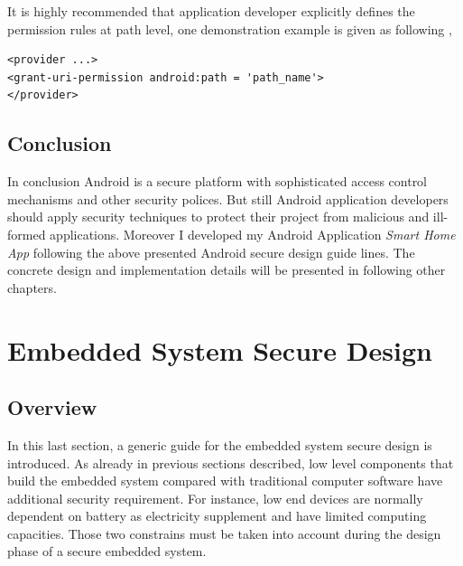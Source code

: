 It is highly recommended that application developer explicitly defines the permission rules at path level, one demonstration example is given as following \cite{android_secure_cook}, 
\begin{Verbatim}[fontsize=\relsize{-1},frame=lines,framesep=4mm, label=\fbox{\small\emph{Content Path Securing}}]
<provider ...>
<grant-uri-permission android:path = 'path_name'>
</provider>
\end{Verbatim} 
\subsection{Conclusion}
In conclusion Android is  a secure platform with sophisticated access control mechanisms and other security polices. But still Android application developers should apply security techniques to protect their project from malicious and ill-formed applications. Moreover I developed my Android Application \emph{Smart Home App} following the above presented Android secure design guide lines. The concrete design and implementation details will be presented in following other chapters. 

\section{Embedded System Secure Design}
\subsection{Overview}
In this last section, a generic guide for the embedded system secure design is introduced. As already in previous sections described, low level components that build the embedded system compared with traditional  computer software have additional security requirement. For instance, low end devices are normally dependent on battery as electricity supplement and have limited computing capacities. Those two constrains must be taken into account during the design phase of a secure embedded system.
